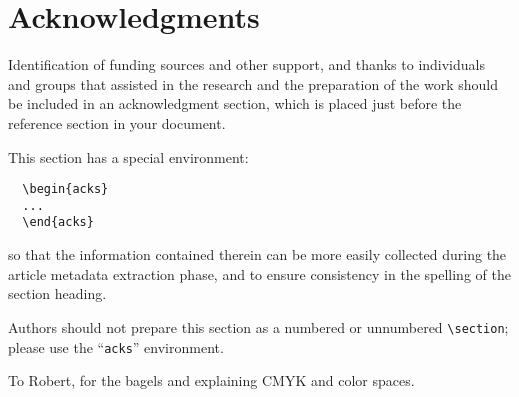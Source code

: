 \documentclass[acmtog, authorversion]{acmart}
\begin{document}
\section{Acknowledgments}

Identification of funding sources and other support, and thanks to
individuals and groups that assisted in the research and the
preparation of the work should be included in an acknowledgment
section, which is placed just before the reference section in your
document.

This section has a special environment:
\begin{verbatim}
  \begin{acks}
  ...
  \end{acks}
\end{verbatim}
so that the information contained therein can be more easily collected
during the article metadata extraction phase, and to ensure
consistency in the spelling of the section heading.

Authors should not prepare this section as a numbered or unnumbered {\verb|\section|}; please use the ``{\verb|acks|}'' environment.

\begin{acks}
To Robert, for the bagels and explaining CMYK and color spaces.
\end{acks}




\appendix
\end{document}
